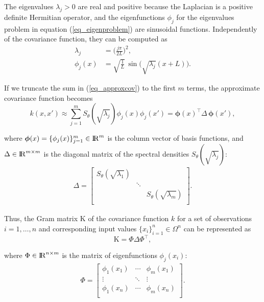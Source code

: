 \documentclass[onecolumn,a4paper,11pt]{article}
\begin{document}
\noindent The eigenvalues $\lambda_j>0$ are real and positive because the Laplacian is a positive definite Hermitian operator, and the eigenfunctions $\phi_j$ for the eigenvalues problem in equation (\ref{eq_eigenproblem}) are sinusoidal functions. Independently of the covariance function, they can be computed as
%
\begin{align}
\lambda_j&=\Big(\frac{j\pi}{2L}\Big)^{\!2}, \label{eq_eigenvalue}\\
\phi_j(x)&=\sqrt{\frac{1}{L}}\, \sin\!\!\big(\sqrt{\lambda_j}(x+L)\big). \label{eq_eigenfunction}
\end{align}

If we truncate the sum in (\ref{eq_approxcov}) to the first $m$ terms, the approximate covariance function becomes
%
\begin{equation}
k(x,x') \approx \sum_{j=1}^m S_{\theta}(\sqrt{\lambda_j}) \phi_j(x) \phi_j(x') = \bm{\phi}(x)^\intercal \Delta \, \bm{\phi}(x'), \nonumber
\end{equation}

\noindent where $\bm{\phi}(x)=\{\phi_j(x)\}_{j=1}^{m} \in {\rm I\!R}^{m}$ is the column vector of basis functions, and $\Delta  \in {\rm I\!R}^{m\times m}$ is the diagonal matrix of the spectral densities $S_{\theta}(\sqrt{\lambda_j})$: 
%
\begin{align}
\Delta =  \begin{bmatrix}
    S_{\theta}(\sqrt{\lambda_1}) & & \\
    & \ddots & \nonumber \\
    & & S_{\theta}(\sqrt{\lambda_m}) \\
  \end{bmatrix}.
\end{align}

Thus, the Gram matrix $\text{K}$ of the covariance function $k$ for a set of observations $i=1,\ldots,n$ and corresponding input values $\{x_i\}_{i=1}^{n} \in \Omega^{n}$ can be represented as
%
\begin{equation}
\text{K}= \Phi \Delta \Phi^\intercal, \nonumber
\end{equation}

\noindent where $\Phi \in {\rm I\!R}^{n\times m}$ is the matrix of eigenfunctions $\phi_j(x_i)$:
%
\begin{align}
\Phi =  \left[ {\begin{array}{ccc}
   \phi_1(x_1) & \cdots & \phi_m(x_1)  \\
    \vdots &\ddots & \vdots  \nonumber \\ 
    \phi_1(x_n) & \cdots & \phi_m(x_n) \\
  \end{array} } \right].
\end{align}
 
\end{document}
